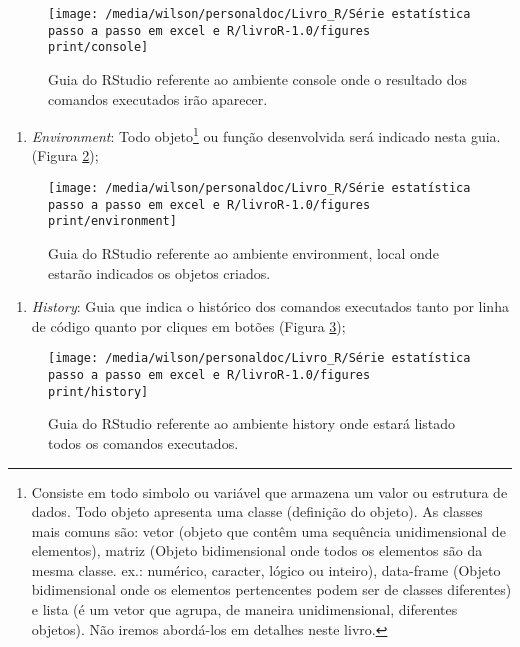 \documentclass[14pt,titlepage, oneside, openany, a4paper]{book}
\providecommand{\tightlist}{%
  \setlength{\itemsep}{0pt}\setlength{\parskip}{0pt}}
\begin{document}
\begin{figure}[H]
\texttt{[image: /media/wilson/personaldoc/Livro\_R/Série estatística passo a passo em excel e R/livroR-1.0/figures print/console]} \caption{Guia do RStudio referente ao ambiente console onde o resultado dos comandos executados irão aparecer.}\label{fig:console}
\end{figure}

\begin{enumerate}
\def\labelenumi{\arabic{enumi}.}
\setcounter{enumi}{2}
\tightlist
\item
  \emph{Environment}: Todo objeto\footnote{Consiste em todo simbolo ou variável que armazena um valor ou estrutura de dados. Todo objeto apresenta uma classe (definição do objeto). As classes mais comuns são: vetor (objeto que contêm uma sequência unidimensional de elementos), matriz (Objeto bidimensional onde todos os elementos são da mesma classe. ex.: numérico, caracter, lógico ou inteiro), data-frame (Objeto bidimensional onde os elementos pertencentes podem ser de classes diferentes) e lista (é um vetor que agrupa, de maneira unidimensional, diferentes objetos). Não iremos abordá-los em detalhes neste livro.} ou função desenvolvida será indicado nesta guia. (Figura \ref{fig:environment});
\end{enumerate}

\begin{figure}[H]
\texttt{[image: /media/wilson/personaldoc/Livro\_R/Série estatística passo a passo em excel e R/livroR-1.0/figures print/environment]} \caption{Guia do RStudio referente ao ambiente environment, local onde estarão indicados os objetos criados.}\label{fig:environment}
\end{figure}

\begin{enumerate}
\def\labelenumi{\arabic{enumi}.}
\setcounter{enumi}{3}
\tightlist
\item
  \emph{History}: Guia que indica o histórico dos comandos executados tanto por linha de código quanto por cliques em botões (Figura \ref{fig:history});
\end{enumerate}

\begin{figure}[H]
\texttt{[image: /media/wilson/personaldoc/Livro\_R/Série estatística passo a passo em excel e R/livroR-1.0/figures print/history]} \caption{Guia do RStudio referente ao ambiente history onde estará listado todos os comandos executados.}\label{fig:history}
\end{figure}
\end{document}
